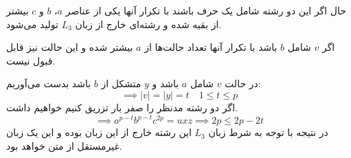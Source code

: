 حال اگر این دو رشته شامل یک حرف باشند با تکرار آنها یکی از عناصر
$a$، $b$ و $c$
بیشتر از بقیه شده و رشته‌ای خارج از زبان
$L_3$
تولید می‌شود.

اگر
$v$
شامل
$b$
باشد با تکرار آنها تعداد حالت‌ها از
$a$
بیشتر شده و این حالت نیز قابل قبول نیست.

در حالت
$v$
شامل
$a$
باشد و 
$y$
متشکل از
$b$
باشد بدست می‌آوریم:
\[
\implies |v| = |y| = t \quad 1 \leq t \leq p    
\]
اگر دو رشته مدنظر را صفر بار تزریق کنیم خواهیم داشت.
\[
\implies a^{p - t} b^{p - t} c^{2p} = u x z \implies 2p \leq 2p - 2t    
\]
در نتیجه با توجه به شرط زبان
$L_3$
این رشته خارج از این زبان بوده و این یک زبان غیرمستقل از متن خواهد بود.